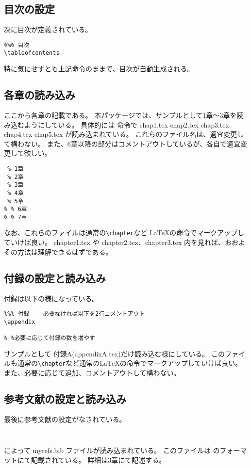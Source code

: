 \subsection{目次の設定}
次に目次が定義されている。
\begin{breakbox}
{\small
\begin{verbatim}
%%% 目次
\tableofcontents
\end{verbatim}
}
\end{breakbox}
特に気にせずとも上記命令のままで、目次が自動生成される。

\subsection{各章の読み込み}
ここから各章の記載である。
本パッケージでは、サンプルとして1章〜3章を読み込むようにしている。
具体的には \verb++ 命令で chap1.tex chap2.tex chap3.tex chap4.tex chap5.tex が読み込まれている。
これらのファイル名は、適宜変更して構わない。
また、6章以降の部分はコメントアウトしているが、各自で適宜変更して欲しい。
\begin{breakbox}
{\small
\begin{verbatim}
 % 1章
 % 2章
 % 3章
 % 4章
 % 5章
% % 6章
% % 7章
\end{verbatim}
}
\end{breakbox}

なお、これらのファイルは通常の\verb+\chapter+など \LaTeX の命令でマークアップしていけば良い。
chapter1.tex や chapter2.tex、chapter3.tex 内を見れば、おおよその方法は理解できるはずである。

\subsection{付録の設定と読み込み}
付録は以下の様になっている。
\begin{breakbox}
{\small
\begin{verbatim}
%%% 付録 -- 必要なければ以下を2行コメントアウト
\appendix

% %必要に応じて付録の数を増やす
\end{verbatim}
}
\end{breakbox}
サンプルとして 付録A(appendixA.tex)だけ読み込む様にしている。
このファイルも通常の\verb+\chapter+など通常の\LaTeX の命令でマークアップしていけば良い。
また、必要に応じて追加、コメントアウトして構わない。

\subsection{参考文献の設定と読み込み}
最後に参考文献の設定がなされている。
\begin{breakbox}
{\small
\begin{verbatim}


\end{verbatim}
}
\end{breakbox}
\verb++によって myrefs.bib ファイルが読み込まれている。
このファイルは \BibTeX のフォーマットにて記載されている。
詳細は3章にて記述する。
